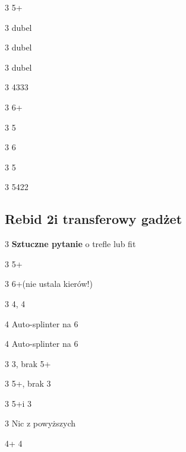 \documentclass[12pt, a4paper]{article}
\begin{document}
\begin{options}[1]
    \item[3\clubs] 5+\clubs
    \item[3\diams] dubel
    \item[3\hearts] dubel
    \item[3\spades] dubel   
    \item[3\nt] 4333 \clubs 
\end{options}

\begin{options}[1]
    \item[3\clubs] 6+\hearts
    \item[3\diams] 5\diams
    \item[3\hearts] 6\hearts
    \item[3\spades] 5\spades   
    \item[3\nt] 5422
\end{options}


\pagebreak
\subsection*{Rebid 2\nt i transferowy gadżet}

\sequence{{1\clubs}{1\hearts}{2\ntx}}
\begin{options}[2]
    \item[3\clubs] \textbf{Sztuczne pytanie} o trefle lub fit \hearts \imp
    \item[3\diams] 5+\diams
    \item[3\hearts] 6+\hearts {}\spades (nie ustala kierów!)  \vimp
    \item[3\spades] 4\hearts, 4\spades 
    \item[4\clubs] Auto-splinter na 6\hearts
    \item[4\diams] Auto-splinter na 6\hearts
\end{options}

\sequence{{1\clubs}{1\hearts}{2\ntx}{3\clubs}}
\begin{options}[1]
    \item[3\diams] 3\hearts, brak 5+\clubs \vimp
    \item[3\hearts] 5+\clubs, brak 3\hearts \vimp
    \item[3\spades] 5+\clubs i 3\hearts \vimp
    \item[3\nt] Nic z powyższych
    \item[4\clubs+] 4\hearts  
\end{options}
\end{document}
